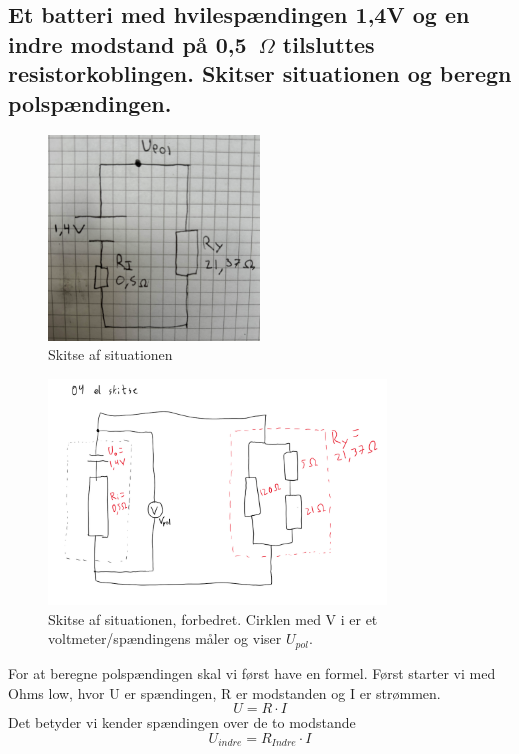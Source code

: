 \subsection{Et batteri med hvilespændingen 1,4V og en indre modstand på 0,5~$\Omega$ tilsluttes resistorkoblingen. Skitser situationen og beregn polspændingen.}
\begin{figure}[h!]
    \centering
    \includegraphics[width=0.5\textwidth]{figures/ellareskitse.png}
    \caption{Skitse af situationen}
\end{figure}
\begin{figure}[h!]
    \centering
    \includegraphics[width=0.8\textwidth]{figures/ellareskitseBille.png}
    \caption{Skitse af situationen, forbedret. Cirklen med V i er et voltmeter/spændingens måler og viser $U_{pol}$.}
\end{figure}
For at beregne polspændingen skal vi først have en formel.\newline
Først starter vi med Ohms low, hvor U er spændingen, R er modstanden og I er strømmen.
\begin{equation*}
    U = R \cdot I
\end{equation*}
Det betyder vi kender spændingen over de to modstande
\begin{equation*}
    U_{indre} = R_{Indre} \cdot I
\end{equation*}
